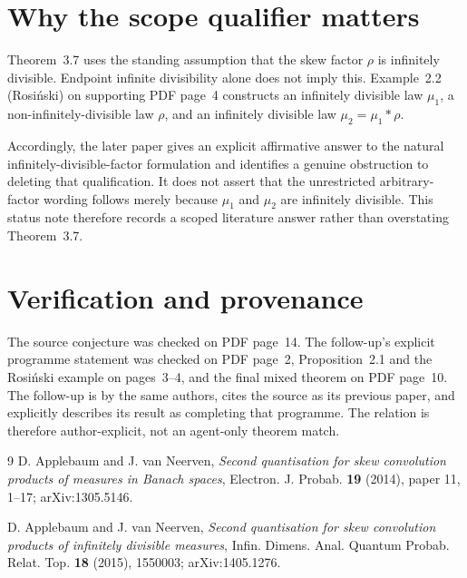 \documentclass[11pt]{article}
\begin{document}
\section*{Why the scope qualifier matters}

Theorem~3.7 uses the standing assumption that the skew factor $\rho$ is
infinitely divisible.  Endpoint infinite divisibility alone does not imply
this.  Example~2.2 (Rosi\'nski) on supporting PDF page~4 constructs an
infinitely divisible law $\mu_1$, a non-infinitely-divisible law $\rho$, and an
infinitely divisible law $\mu_2=\mu_1*\rho$.

Accordingly, the later paper gives an explicit affirmative answer to the
natural infinitely-divisible-factor formulation and identifies a genuine
obstruction to deleting that qualification.  It does not assert that the
unrestricted arbitrary-factor wording follows merely because $\mu_1$ and
$\mu_2$ are infinitely divisible.  This status note therefore records a
scoped literature answer rather than overstating Theorem~3.7.

\section*{Verification and provenance}

The source conjecture was checked on PDF page~14.  The follow-up's explicit
programme statement was checked on PDF page~2, Proposition~2.1 and the
Rosi\'nski example on pages~3--4, and the final mixed theorem on PDF page~10.
The follow-up is by the same authors, cites the source as its previous paper,
and explicitly describes its result as completing that programme.  The
relation is therefore author-explicit, not an agent-only theorem match.

\begin{thebibliography}{9}
D. Applebaum and J. van Neerven,
\emph{Second quantisation for skew convolution products of measures in
Banach spaces},
Electron. J. Probab. \textbf{19} (2014), paper 11, 1--17;
arXiv:1305.5146.

D. Applebaum and J. van Neerven,
\emph{Second quantisation for skew convolution products of infinitely
divisible measures},
Infin. Dimens. Anal. Quantum Probab. Relat. Top. \textbf{18} (2015),
1550003;
arXiv:1405.1276.
\end{thebibliography}
\end{document}

